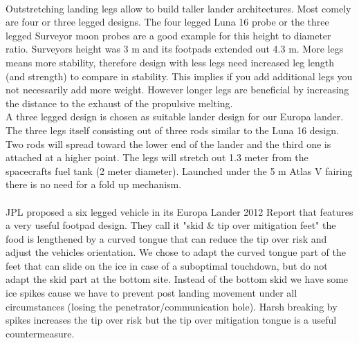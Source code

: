 \\
Outstretching landing legs allow to build taller lander architectures. Most comely are four or three legged designs. The four legged Luna 16 probe or the three legged Surveyor moon probes are a good example for this height to diameter ratio. Surveyors height was 3 m and its footpads extended out 4.3 m. More legs means more stability, therefore design with less legs need increased leg length (and strength) to compare in stability. This implies if you add additional legs you not necessarily add more weight. However longer legs are beneficial by increasing the distance to the exhaust of the propulsive melting. \\
A three legged design is chosen as suitable lander design for our Europa lander. The three legs itself consisting out of three rods similar to the Luna 16 design. Two rods will spread toward the lower end of the lander and the third one is attached at a higher point. The legs will stretch out 1.3 meter from the spacecrafts fuel tank (2 meter diameter).  Launched under the 5 m Atlas V fairing there is no need for a fold up mechanism.\\
\\
JPL proposed a six legged vehicle in its Europa Lander 2012 Report that features a very useful footpad design. They call it "skid \& tip over mitigation feet" the food is lengthened by a curved tongue that can reduce the tip over risk and adjust the vehicles orientation. We chose to adapt the curved tongue part of the feet that can slide on the ice in case of a suboptimal touchdown, but do not adapt the skid part at the bottom site. Instead of the bottom skid we have some ice spikes cause we have to prevent post landing movement under all circumstances (losing the penetrator/communication hole). Harsh breaking by spikes increases the tip over risk but the tip over mitigation tongue is a useful countermeasure.

